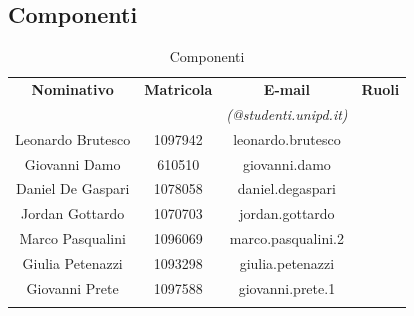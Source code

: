 \subsection{Componenti}
\begin{table}[H]
		\begin{center}
		\begin{tabular}{cccc}
			\toprule
			\textbf{Nominativo} & \textbf{Matricola} & \textbf{E-mail} & \textbf{Ruoli} \\
			 &  & \textit{(@studenti.unipd.it)} & \\
			\midrule
	 		\multirow{2}{*}{Leonardo Brutesco} & \multirow{2}{*}{1097942}	& \multirow{2}{*}{leonardo.brutesco} & \programmatore{} \\ & & & \verificatore{}\\
			\midrule
			\multirow{2}{*}{Giovanni Damo}	& \multirow{2}{*}{610510}	& \multirow{2}{*}{giovanni.damo} & \\ & & &  \\
			\midrule
			\multirow{2}{*}{Daniel De Gaspari} 	& \multirow{2}{*}{1078058}	& \multirow{2}{*}{daniel.degaspari} & \amministratore{}\\ & & & \verificatore{}\\
			\midrule
			\multirow{2}{*}{Jordan Gottardo}	& \multirow{2}{*}{1070703}	& \multirow{2}{*}{jordan.gottardo} & \programmatore{}\\ & & & \verificatore{} \\
			\midrule
			\multirow{2}{*}{Marco Pasqualini} & \multirow{2}{*}{1096069} &  \multirow{2}{*}{marco.pasqualini.2} & \responsabile{}\\ & & & \verificatore{}\\
			\midrule
			\multirow{2}{*}{Giulia	Petenazzi}	& \multirow{2}{*}{1093298}	& \multirow{2}{*}{giulia.petenazzi} & \programmatore{}\\	& & &  \verificatore{}\\
			\midrule
			\multirow{2}{*}{Giovanni Prete}	& \multirow{2}{*}{1097588}	& \multirow{2}{*}{giovanni.prete.1} & \responsabile{}\\ & & &  \programmatore{}\\ & & & \verificatore{}
			\\
			\bottomrule
		\end{tabular}
	\end{center}
	\caption{Componenti}
\end{table}
